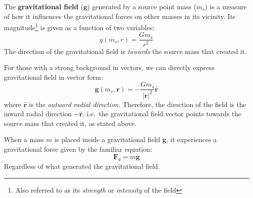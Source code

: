 The \textbf{gravitational field} ($\bm g$) generated by a source point mass
($m_s$) is a measure of how it influences the gravitational forces on other
masses in its vicinity.
Its magnitude\footnote{Also referred to as its \emph{strength} or
\emph{intensity} of the field} is given as a function of two variables:
\begin{equation}
  \boxed{
    g(m_s,r)=\frac{Gm_s}{r^2}}
\end{equation}
The direction of the gravitational field is \emph{towards} the source mass
that created it.
\begin{remark}%
  For those with a strong background in vectors, we can directly express
  gravitational field in vector form:
  \begin{equation*}
    \boxed{
      \bm g(m_s,\bm r)=-\frac{Gm_s}{|\bm r|^2}\hat{\bm r}
    }
  \end{equation*}
  where $\hat{\bm r}$ is the \emph{outward radial direction}. Therefore,
  the direction of the field is the inward radial direction $-\hat{\bm r}$,
  i.e.\ the gravitational field vector points towards the source mass that
  created it, as stated above.
\end{remark}%



When a mass $m$ is placed inside a gravitational field $\bm g$, it
experiences a gravitational force given by the familiar equation:
\begin{equation*}
  \bm F_g=m\bm g
\end{equation*}
Regardless of what generated the gravitational field.



